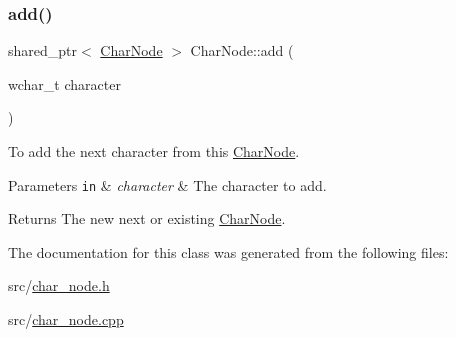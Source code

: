\subsubsection{\texorpdfstring{add()}{add()}}
{\footnotesize\ttfamily shared\+\_\+ptr$<$ \hyperlink{classlakoo_1_1_char_node}{Char\+Node} $>$ Char\+Node\+::add (\begin{DoxyParamCaption}\item[{wchar\+\_\+t}]{character }\end{DoxyParamCaption})}



To add the next character from this \hyperlink{classlakoo_1_1_char_node}{Char\+Node}. 


\begin{DoxyParams}[1]{Parameters}
\mbox{\tt in}  & {\em character} & The character to add. \\
\hline
\end{DoxyParams}
\begin{DoxyReturn}{Returns}
The new next or existing \hyperlink{classlakoo_1_1_char_node}{Char\+Node}. 
\end{DoxyReturn}


The documentation for this class was generated from the following files\+:\begin{DoxyCompactItemize}
\item 
src/\hyperlink{char__node_8h}{char\+\_\+node.\+h}\item 
src/\hyperlink{char__node_8cpp}{char\+\_\+node.\+cpp}\end{DoxyCompactItemize}
